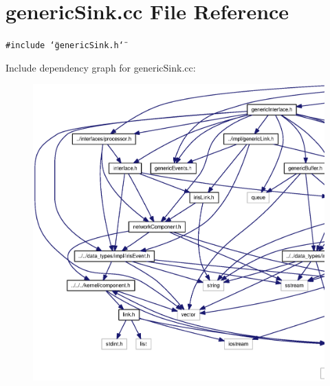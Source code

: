 \section{genericSink.cc File Reference}
\label{genericSink_8cc}
{\tt \#include \char`\"{}genericSink.h\char`\"{}}\par


Include dependency graph for genericSink.cc:\nopagebreak
\begin{figure}[H]
\begin{center}
\leavevmode
\includegraphics[width=420pt]{genericSink_8cc__incl}
\end{center}
\end{figure}
